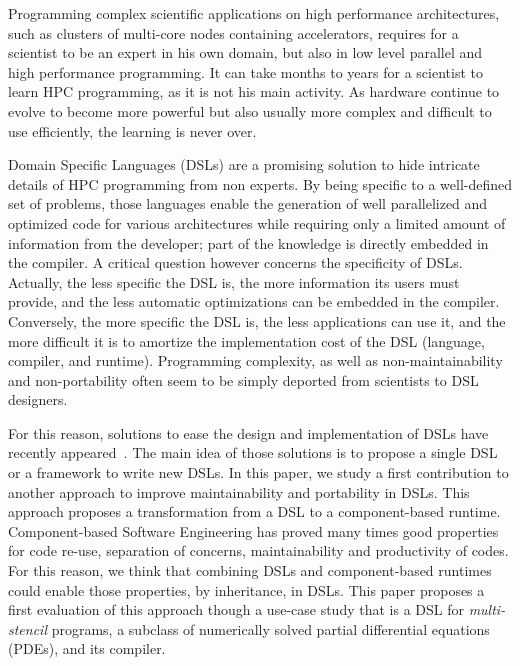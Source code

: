 Programming complex scientific applications on high performance architectures, such as clusters of multi-core nodes containing accelerators, requires for a scientist to be an expert in his own domain, but also in low level parallel and high performance programming. It can take months to years for a scientist to learn HPC programming, as it is not his main activity. As hardware continue to evolve to become more powerful but also usually more complex and difficult to use efficiently, the learning is never over.

Domain Specific Languages (DSLs) are a promising solution to hide intricate details of HPC programming from non experts.
By being specific to a well-defined set of problems, those languages enable the generation of well parallelized and optimized code for various architectures while requiring only a limited amount of information from the developer; part of the knowledge is directly embedded in the compiler.
A critical question however concerns the specificity of DSLs.
Actually, the less specific the DSL is, the more information its users must provide, and the less automatic optimizations can be embedded in the compiler.
Conversely, the more specific the DSL is, the less applications can use it, and the more difficult it is to amortize the implementation cost of the DSL (language, compiler, and runtime).
Programming complexity, as well as non-maintainability and non-portability often seem to be simply deported from scientists to DSL designers.

For this reason, solutions to ease the design and implementation of DSLs have recently appeared~\cite{Fernandez:2014:DFL:2691166.2691168}. The main idea of those solutions is to propose a single DSL or a framework to write new DSLs. In this paper, we study a first contribution to another approach to improve maintainability and portability in DSLs. This approach proposes a transformation from a DSL to a component-based runtime. Component-based Software Engineering has proved many times good properties for code re-use, separation of concerns, maintainability and productivity of codes. For this reason, we think that combining DSLs and component-based runtimes could enable those properties, by inheritance, in DSLs.
This paper proposes a first evaluation of this approach though a use-case study that is a DSL for \emph{multi-stencil} programs, \ie a subclass of numerically solved partial differential equations (PDEs), and its compiler.

